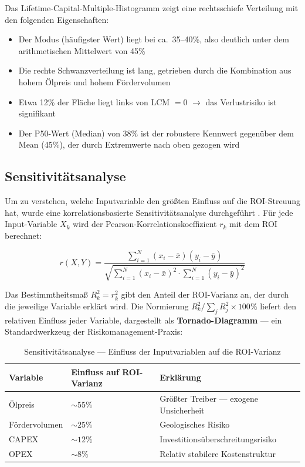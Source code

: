 \documentclass[11pt,a4paper]{article}
\begin{document}
Das Lifetime-Capital-Multiple-Histogramm zeigt eine rechtsschiefe Verteilung mit den folgenden Eigenschaften:
\begin{itemize}[itemsep=2pt]
  \item Der Modus (häufigster Wert) liegt bei ca.\ 35–40\%, also deutlich unter dem arithmetischen Mittelwert von 45\%
  \item Die rechte Schwanzverteilung ist lang, getrieben durch die Kombination aus hohem Ölpreis und hohem Fördervolumen
  \item Etwa 12\% der Fläche liegt links von LCM $= 0$ $\rightarrow$ das Verlustrisiko ist signifikant
  \item Der P50-Wert (Median) von 38\% ist der robustere Kennwert gegenüber dem Mean (45\%), der durch Extremwerte nach oben gezogen wird
\end{itemize}

\subsection{Sensitivitätsanalyse}

Um zu verstehen, welche Inputvariable den größten Einfluss auf die ROI-Streuung hat, wurde eine korrelationsbasierte Sensitivitätsanalyse durchgeführt \cite{spe52949}. Für jede Input-Variable $X_k$ wird der Pearson-Korrelationskoeffizient $r_k$ mit dem ROI berechnet:

\begin{equation}
r(X, Y) = \frac{\sum_{i=1}^{N}(x_i - \bar{x})(y_i - \bar{y})}{\sqrt{\sum_{i=1}^{N}(x_i - \bar{x})^2 \cdot \sum_{i=1}^{N}(y_i - \bar{y})^2}}
\end{equation}

Das Bestimmtheitsmaß $R^2_k = r_k^2$ gibt den Anteil der ROI-Varianz an, der durch die jeweilige Variable erklärt wird. Die Normierung $R^2_k / \sum_j R^2_j \times 100\%$ liefert den relativen Einfluss jeder Variable, dargestellt als \textbf{Tornado-Diagramm} — ein Standardwerkzeug der Risikomanagement-Praxis:

\begin{table}[H]
\centering
\begin{tabular}{llp{5.5cm}}
\toprule
\textbf{Variable} & \textbf{Einfluss auf ROI-Varianz} & \textbf{Erklärung} \\
\midrule
Ölpreis        & ${\sim}55\%$ & Größter Treiber — exogene Unsicherheit \\
Fördervolumen  & ${\sim}25\%$ & Geologisches Risiko \\
CAPEX          & ${\sim}12\%$ & Investitionsüberschreitungsrisiko \\
OPEX           & ${\sim}8\%$  & Relativ stabilere Kostenstruktur \\
\bottomrule
\end{tabular}
\caption{Sensitivitätsanalyse — Einfluss der Inputvariablen auf die ROI-Varianz}
\end{table}
\end{document}
